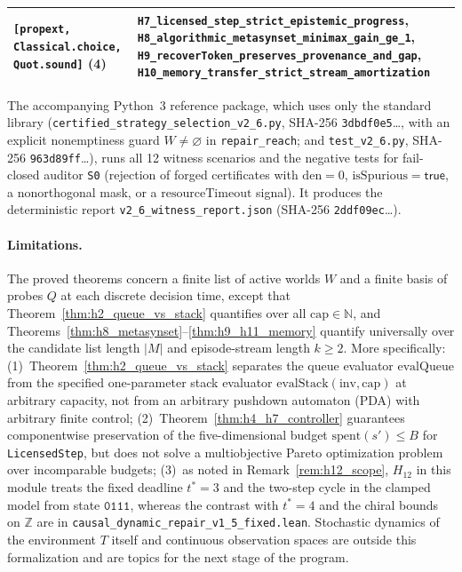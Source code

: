 \documentclass[11pt,a4paper]{article}
\theoremstyle{cleanthm}
\DeclareRobustCommand{\id}[1]{\allowbreak\nolinkurl{#1}\allowbreak}
\begin{document}
\begin{table}[H]
\begin{tabularx}{\linewidth}{@{}p{.31\linewidth} >{\raggedright\arraybackslash}X@{}}
\texttt{[propext, Classical.choice, Quot.sound]} (4) & \texttt{H7\_licensed\_\allowbreak step\_\allowbreak strict\_\allowbreak epistemic\_\allowbreak progress}, \texttt{H8\_algorithmic\_\allowbreak metasynset\_\allowbreak minimax\_\allowbreak gain\_\allowbreak ge\_1}, \texttt{H9\_recoverToken\_\allowbreak preserves\_\allowbreak provenance\_\allowbreak and\_\allowbreak gap}, \texttt{H10\_memory\_\allowbreak transfer\_\allowbreak strict\_\allowbreak stream\_\allowbreak amortization} \\
\bottomrule
\end{tabularx}
\end{table}
The accompanying Python~3 reference package, which uses only the standard library (\id{certified_strategy_selection_v2_6.py}, SHA-256 \id{3dbdf0e5}\ldots, with an explicit nonemptiness guard $W\ne\varnothing$ in \id{repair_reach}; and \id{test_v2_6.py}, SHA-256 \id{963d89ff}\ldots), runs all 12 witness scenarios and the negative tests for fail-closed auditor \id{S0} (rejection of forged certificates with $\mathrm{den}=0$, $\mathrm{isSpurious}=\mathsf{true}$, a nonorthogonal mask, or a $\mathrm{resourceTimeout}$ signal). It produces the deterministic report \id{v2_6_witness_report.json} (SHA-256 \id{2ddf09ec}\ldots).

\paragraph{Limitations.}
The proved theorems concern a finite list of active worlds $W$ and a finite basis of probes $Q$ at each discrete decision time, except that Theorem~\ref{thm:h2_queue_vs_stack} quantifies over all $\mathrm{cap}\in\mathbb N$, and Theorems~\ref{thm:h8_metasynset}--\ref{thm:h9_h11_memory} quantify universally over the candidate list length $|M|$ and episode-stream length $k\ge2$. More specifically: (1)~Theorem~\ref{thm:h2_queue_vs_stack} separates the queue evaluator $\mathrm{evalQueue}$ from the specified one-parameter stack evaluator $\mathrm{evalStack}(\mathrm{inv},\mathrm{cap})$ at arbitrary capacity, not from an arbitrary pushdown automaton (PDA) with arbitrary finite control; (2)~Theorem~\ref{thm:h4_h7_controller} guarantees componentwise preservation of the five-dimensional budget $\mathrm{spent}(s')\le B$ for \id{LicensedStep}, but does not solve a multiobjective Pareto optimization problem over incomparable budgets; (3)~as noted in Remark~\ref{rem:h12_scope}, $H_{12}$ in this module treats the fixed deadline $t^*=3$ and the two-step cycle in the clamped model from state $\mathtt{0111}$, whereas the contrast with $t^*=4$ and the chiral bounds on $\mathbb Z$ are in \id{causal_dynamic_repair_v1_5_fixed.lean}. Stochastic dynamics of the environment $T$ itself and continuous observation spaces are outside this formalization and are topics for the next stage of the program.
\end{document}
